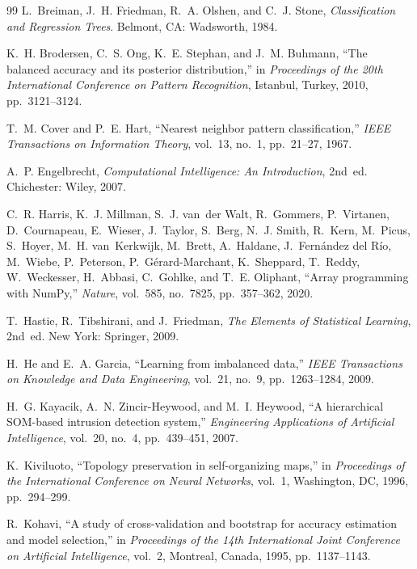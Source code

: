\documentclass[conference,10pt]{IEEEtran}
\begin{document}
\begin{thebibliography}{99}
L.~Breiman, J.~H. Friedman, R.~A. Olshen, and C.~J. Stone, \emph{Classification and Regression Trees}. Belmont, CA: Wadsworth, 1984.

K.~H. Brodersen, C.~S. Ong, K.~E. Stephan, and J.~M. Buhmann, ``The balanced accuracy and its posterior distribution,'' in \emph{Proceedings of the 20th International Conference on Pattern Recognition}, Istanbul, Turkey, 2010, pp.~3121--3124.

T.~M. Cover and P.~E. Hart, ``Nearest neighbor pattern classification,'' \emph{IEEE Transactions on Information Theory}, vol.~13, no.~1, pp.~21--27, 1967.

A.~P. Engelbrecht, \emph{Computational Intelligence: An Introduction}, 2nd~ed. Chichester: Wiley, 2007.

C.~R. Harris, K.~J. Millman, S.~J. van~der Walt, R.~Gommers, P.~Virtanen, D.~Cournapeau, E.~Wieser, J.~Taylor, S.~Berg, N.~J. Smith, R.~Kern, M.~Picus, S.~Hoyer, M.~H. van~Kerkwijk, M.~Brett, A.~Haldane, J.~Fern\'andez del R\'io, M.~Wiebe, P.~Peterson, P.~G\'erard-Marchant, K.~Sheppard, T.~Reddy, W.~Weckesser, H.~Abbasi, C.~Gohlke, and T.~E. Oliphant, ``Array programming with NumPy,'' \emph{Nature}, vol.~585, no.~7825, pp.~357--362, 2020.

T.~Hastie, R.~Tibshirani, and J.~Friedman, \emph{The Elements of Statistical Learning}, 2nd~ed. New York: Springer, 2009.

H.~He and E.~A. Garcia, ``Learning from imbalanced data,'' \emph{IEEE Transactions on Knowledge and Data Engineering}, vol.~21, no.~9, pp.~1263--1284, 2009.

H.~G. Kayacik, A.~N. Zincir-Heywood, and M.~I. Heywood, ``A hierarchical SOM-based intrusion detection system,'' \emph{Engineering Applications of Artificial Intelligence}, vol.~20, no.~4, pp.~439--451, 2007.

K.~Kiviluoto, ``Topology preservation in self-organizing maps,'' in \emph{Proceedings of the International Conference on Neural Networks}, vol.~1, Washington, DC, 1996, pp.~294--299.

R.~Kohavi, ``A study of cross-validation and bootstrap for accuracy estimation and model selection,'' in \emph{Proceedings of the 14th International Joint Conference on Artificial Intelligence}, vol.~2, Montreal, Canada, 1995, pp.~1137--1143.


\end{thebibliography}
\end{document}
